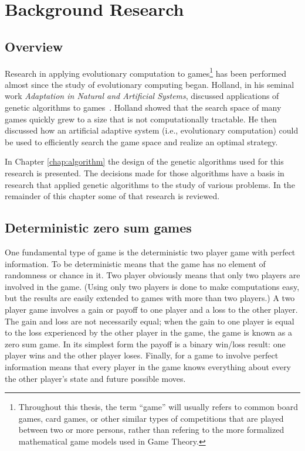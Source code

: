 \clearpage
\chapter{Background Research}\label{chap:background}

\section{Overview}

Research in applying evolutionary computation to games\footnote{Throughout this
thesis, the term ``game'' will usually refers to common board games, card games,
or other similar types of competitions that are played between two or more
persons, rather than refering to the more formalized mathematical game models
used in Game Theory.} has been performed almost since the study of evolutionary
computing began. Holland, in his seminal work \emph{Adaptation in Natural and
Artificial Systems}, discussed applications of genetic algorithms to
games~\cite{holland1975adaptation,Holland1992}. Holland showed that the search
space of many games quickly grew to a size that is not computationally
tractable. He then discussed how an artificial adaptive system (i.e.,
evolutionary computation) could be used to efficiently search the game space and
realize an optimal strategy.

In Chapter \ref{chap:algorithm} the design of the genetic algorithms used for
this research is presented. The decisions made for those algorithms have a basis
in research that applied genetic algorithms to the study of various problems. In
the remainder of this chapter some of that research is reviewed.

\section{Deterministic zero sum games}

One fundamental type of game is the deterministic two player game with perfect
information. To be deterministic means that the game has no element of
randomness or chance in it. Two player obviously means that only two players are
involved in the game. (Using only two players is done to make computations easy,
but the results are easily extended to games with more than two players.) A two
player game involves a gain or payoff to one player and a loss to the other
player. The gain and loss are not necessarily equal; when the gain to one player
is equal to the loss experienced by the other player in the game, the game is
known as a zero sum game. In its simplest form the payoff is a binary win/loss
result: one player wins and the other player loses. Finally, for a game to
involve perfect information means that every player in the game knows everything
about every the other player's state and future possible moves.

